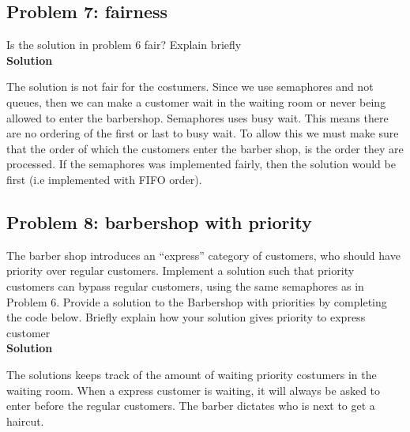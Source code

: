 \subsection{Problem 7: fairness}

Is the solution in problem 6 fair? Explain briefly \\

\textbf{Solution}

The solution is not fair for the costumers. Since we use semaphores and not queues, then we can make a customer wait in the waiting room or never being allowed to enter the barbershop.
Semaphores uses busy wait. This means there are no ordering of the first or last to busy wait. To allow this we must make sure that the order of which the customers enter the barber shop, is the order they are processed. 
If the semaphores was implemented fairly, then the solution would be first (i.e implemented with FIFO order). 


\subsection{Problem 8: barbershop with priority}

The barber shop introduces an “express” category of customers, who should have priority over regular customers. 
Implement a solution such that priority customers can bypass regular customers, using the same semaphores as in Problem 6. 
Provide a solution to the Barbershop with priorities by completing the code below. Briefly explain how your solution gives priority to express customer \\

\textbf{Solution}

The solutions keeps track of the amount of waiting priority costumers in the waiting room. 
When a express customer is waiting, it will always be asked to enter before the regular customers. 
The barber dictates who is next to get a haircut. 

